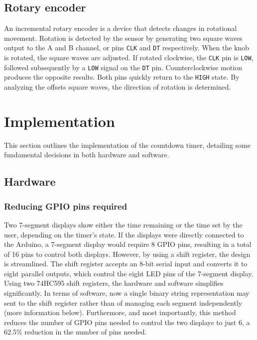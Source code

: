 \documentclass[fleqn]{article}
\begin{document}
\subsection*{Rotary encoder}
An incremental rotary encoder is a device that detects changes in rotational movement. Rotation is detected by the sensor by generating two square waves output to the A and B channel, or pins \verb|CLK| and \verb|DT| respectively. When the knob is rotated, the square waves are adjusted. If rotated clockwise, the \verb|CLK| pin is \verb|LOW|, followed subsequently by a \verb|LOW| signal on the \verb|DT| pin. Counterclockwise motion produces the opposite results. Both pins quickly return to the \verb|HIGH| state. By analyzing the offsets square waves, the direction of rotation is determined. 


\section*{Implementation}
This section outlines the implementation of the countdown timer, detailing some fundamental decisions in both hardware and software.

\subsection*{Hardware}
\subsubsection*{Reducing GPIO pins required}
Two 7-segment displays show either the time remaining or the time set by the user, depending on the timer's state. If the displays were directly connected to the Arduino, a 7-segment display would require 8 GPIO pins, resulting in a total of 16 pins to control both displays. However, by using a shift register, the design is streamlined. The shift register accepts an 8-bit serial input and converts it to eight parallel outputs, which control the eight LED pins of the 7-segment display. Using two 74HC595 shift registers, the hardware and software simplifies significantly. In terms of software, now a single binary string representation may sent to the shift register rather than of managing each segment independently (more information below). Furthermore, and most importantly, this method reduces the number of GPIO pins needed to control the two displays to just 6, a 62.5\% reduction in the number of pins needed.
\end{document}
